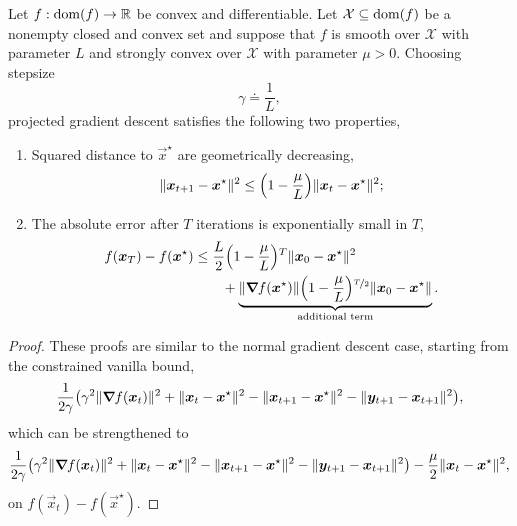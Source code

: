 \begin{theorem}
    Let $f: \mathrm{dom}(f) \to \mathbb{R}$ be convex and differentiable. Let $\mathcal{X} \subseteq \mathrm{dom}(f)$ be a
    nonempty closed and convex set and suppose that $f$ is smooth over $\mathcal{X}$ with parameter
    $L$ and strongly convex over $\mathcal{X}$ with parameter $\mu > 0$. Choosing stepsize \[
        \gamma \doteq \frac{1}{L},
    \]
    projected gradient descent satisfies the following two properties,
    \begin{enumerate}
        \item Squared distance to $\vec{x}^\star$ are geometrically decreasing, \[
                  \| \vec{x}_{t+1} - \vec{x}^\star \|^2 \leq \lft( 1 - \frac{\mu}{L} \rgt) \|\vec{x}_t - \vec{x}^\star\|^2;
              \]
        \item The absolute error after $T$ iterations is exponentially small in $T$,
              \begin{align*}
                  f(\vec{x}_T) - f(\vec{x}^\star) & \leq \frac{L}{2} \lft( 1 - \frac{\mu}{L} \rgt)^T \| \vec{x}_0 - \vec{x}^\star \|^2                                                                          \\
                                                  & \qquad + \underbrace{\|\grad{f(\vec{x}^\star)}{}\| \lft( 1 - \frac{\mu}{L} \rgt)^{\nicefrac{T}{2}} \|\vec{x}_0 - \vec{x}^\star\|}_{\text{additional term}}.
              \end{align*}
    \end{enumerate}
\end{theorem}

\begin{proof}
    These proofs are similar to the normal gradient descent case, starting from the constrained vanilla bound, \[
        \frac{1}{2 \gamma} \lft( \gamma^2 \| \grad{f(\vec{x}_t)}{} \|^2 + \|\vec{x}_t - \vec{x}^\star\|^2 - \|\vec{x}_{t+1}-\vec{x}^\star\|^2 - \|\vec{y}_{t+1}-\vec{x}_{t+1}\|^2 \rgt),
    \]
    which can be strengthened to \[
        \frac{1}{2 \gamma} \lft( \gamma^2 \| \grad{f(\vec{x}_t)}{} \|^2 + \|\vec{x}_t - \vec{x}^\star\|^2 - \|\vec{x}_{t+1}-\vec{x}^\star\|^2 - \|\vec{y}_{t+1}-\vec{x}_{t+1}\|^2 \rgt) - \frac{\mu}{2} \|\vec{x}_t - \vec{x}^\star\|^2,
    \]
    on $f(\vec{x}_t) - f(\vec{x}^\star)$.
\end{proof}
